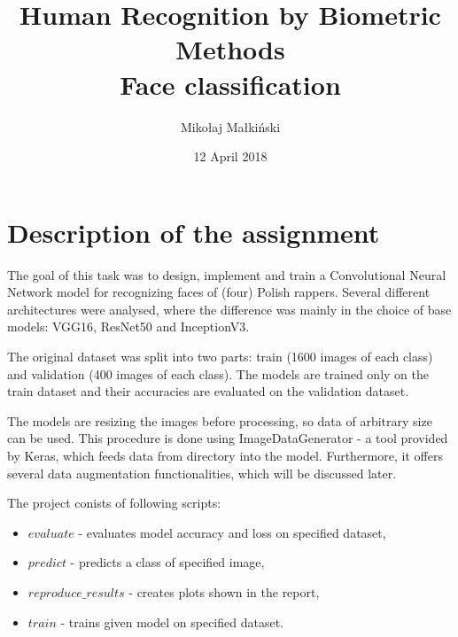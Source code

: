 \documentclass[a4paper,12pt]{article}
\title{
\textbf{Human Recognition by Biometric Methods}\\
\bigskip
\textbf{Face classification}\\
\bigskip
}
\author{Mikołaj Małkiński}
\date{12 April 2018}
\begin{document}
    \maketitle

    \section{Description of the assignment}

    The goal of this task was to design, implement and train a Convolutional Neural Network model for recognizing faces of (four) Polish rappers. Several different architectures were analysed, where the difference was mainly in the choice of base models: VGG16, ResNet50 and InceptionV3.
    \par
    The original dataset was split into two parts: train (1600 images of each class) and validation (400 images of each class). The models are trained only on the train dataset and their accuracies are evaluated on the validation dataset.
    \par
    The models are resizing the images before processing, so data of arbitrary size can be used. This procedure is done using ImageDataGenerator - a tool provided by Keras, which feeds data from directory into the model. Furthermore, it offers several data augmentation functionalities, which will be discussed later.
    \par
    The project conists of following scripts:
    \begin{itemize}
        \item $evaluate$ - evaluates model accuracy and loss on specified dataset,
        \item $predict$ - predicts a class of specified image,
        \item $reproduce\_results$ - creates plots shown in the report,
        \item $train$ - trains given model on specified dataset.
    \end{itemize}
\end{document}
